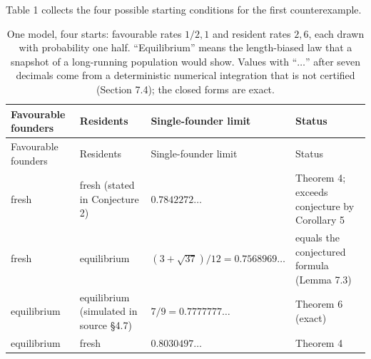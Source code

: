 \documentclass[
  british,
  11pt,
  a4paper,
]{article}
\begin{document}
Table 1 collects the four possible starting conditions for the first
counterexample.

\begin{longtable}[]{@{}
  >{\raggedright\arraybackslash}p{}
  >{\raggedright\arraybackslash}p{}
  >{\raggedleft\arraybackslash}p{}
  >{\raggedright\arraybackslash}p{}@{}}
\caption{One model, four starts: favourable rates \(1/2,1\) and resident
rates \(2,6\), each drawn with probability one half. ``Equilibrium''
means the length-biased law that a snapshot of a long-running population
would show. Values with ``\(\ldots\)'' after seven decimals come from a
deterministic numerical integration that is not certified (Section 7.4);
the closed forms are exact.}\tabularnewline
\toprule\noalign{}
\begin{minipage}[b]{\linewidth}\raggedright
Favourable founders
\end{minipage} & \begin{minipage}[b]{\linewidth}\raggedright
Residents
\end{minipage} & \begin{minipage}[b]{\linewidth}\raggedleft
Single-founder limit
\end{minipage} & \begin{minipage}[b]{\linewidth}\raggedright
Status
\end{minipage} \\
\midrule\noalign{}
\endfirsthead
\toprule\noalign{}
\begin{minipage}[b]{\linewidth}\raggedright
Favourable founders
\end{minipage} & \begin{minipage}[b]{\linewidth}\raggedright
Residents
\end{minipage} & \begin{minipage}[b]{\linewidth}\raggedleft
Single-founder limit
\end{minipage} & \begin{minipage}[b]{\linewidth}\raggedright
Status
\end{minipage} \\
\midrule\noalign{}
\endhead
\bottomrule\noalign{}
\endlastfoot
fresh & fresh (stated in Conjecture 2) & \(0.7842272\ldots\) & Theorem
4; exceeds conjecture by Corollary 5 \\
fresh & equilibrium & \((3+\sqrt{37})/12=0.7568969\ldots\) & equals the
conjectured formula (Lemma 7.3) \\
equilibrium & equilibrium (simulated in source §4.7) &
\(7/9=0.7777777\ldots\) & Theorem 6 (exact) \\
equilibrium & fresh & \(0.8030497\ldots\) & Theorem 4 \\
\end{longtable}
\end{document}
